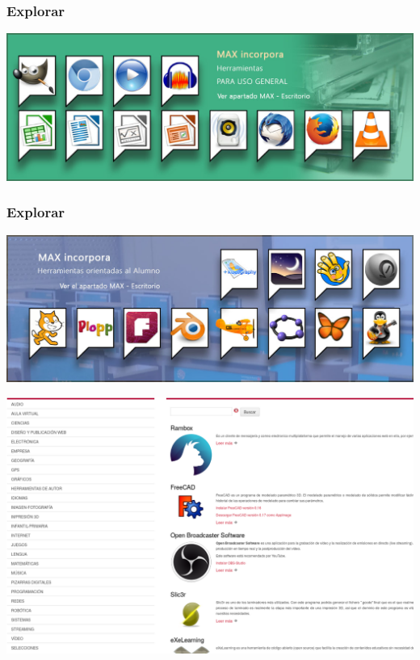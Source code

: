 \documentclass[17pt,aspectratio=169]{beamer}
\begin{document}

\begin{frame}
\frametitle{Explorar}

\includegraphics[width=\linewidth]{figs/max-1}

\end{frame}


\begin{frame}
\frametitle{Explorar}

\includegraphics[width=\linewidth]{figs/max-2}

\end{frame}


\begin{frame}

\includegraphics[width=\linewidth]{figs/max-3}

\end{frame}
\end{document}

